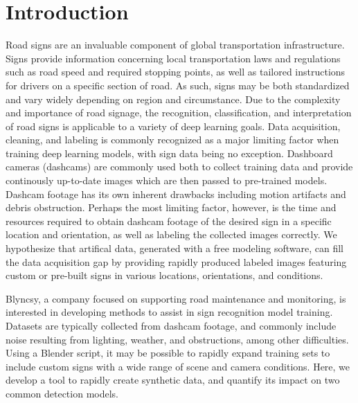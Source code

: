 \documentclass[journal]{IEEEtran}
\begin{document}
\IEEEpeerreviewmaketitle



\section{Introduction}


 
Road signs are an invaluable component of global transportation infrastructure. Signs provide information concerning local transportation laws and regulations such as road speed and required stopping points, as well as tailored instructions for drivers on a specific section of road. As such, signs may be both standardized and vary widely depending on region and circumstance. Due to the complexity and importance of road signage, the recognition, classification, and interpretation of road signs is applicable to a variety of deep learning goals. Data acquisition, cleaning, and labeling is commonly recognized as a major limiting factor when training deep learning models\cite{Whang_datacollection}, with sign data being no exception. Dashboard cameras (dashcams) are commonly used both to collect training data and provide continously up-to-date images which are then passed to pre-trained models. Dashcam footage has its own inherent drawbacks including motion artifacts and debris obstruction. Perhaps the most limiting factor, however, is the time and resources required to obtain dashcam footage of the desired sign in a specific location and orientation, as well as labeling the collected images correctly. We hypothesize that artifical data, generated with a free modeling software, can fill the data acquisition gap by providing rapidly produced labeled images featuring custom or pre-built signs in various locations, orientations, and conditions. 


Blyncsy, a company focused on supporting road maintenance and monitoring, is interested in developing methods to assist in sign recognition model training. Datasets are typically collected from dashcam footage, and commonly include noise resulting from lighting, weather, and obstructions, among other difficulties. Using a Blender script, it may be possible to rapidly expand training sets to include custom signs with a wide range of scene and camera conditions. Here, we develop a tool to rapidly create synthetic data, and quantify its impact on two common detection models. 
\end{document}
